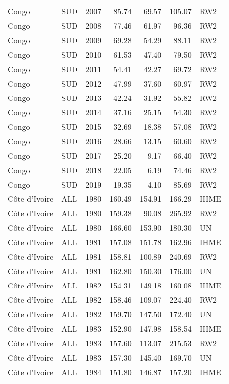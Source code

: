 \begin{longtable}{lllrrrl}
  Congo & SUD & 2007 & 85.74 & 69.57 & 105.07 & RW2 \\ 
  Congo & SUD & 2008 & 77.46 & 61.97 & 96.36 & RW2 \\ 
  Congo & SUD & 2009 & 69.28 & 54.29 & 88.11 & RW2 \\ 
  Congo & SUD & 2010 & 61.53 & 47.40 & 79.50 & RW2 \\ 
  Congo & SUD & 2011 & 54.41 & 42.27 & 69.72 & RW2 \\ 
  Congo & SUD & 2012 & 47.99 & 37.60 & 60.97 & RW2 \\ 
  Congo & SUD & 2013 & 42.24 & 31.92 & 55.82 & RW2 \\ 
  Congo & SUD & 2014 & 37.16 & 25.15 & 54.30 & RW2 \\ 
  Congo & SUD & 2015 & 32.69 & 18.38 & 57.08 & RW2 \\ 
  Congo & SUD & 2016 & 28.66 & 13.15 & 60.60 & RW2 \\ 
  Congo & SUD & 2017 & 25.20 & 9.17 & 66.40 & RW2 \\ 
  Congo & SUD & 2018 & 22.05 & 6.19 & 74.46 & RW2 \\ 
  Congo & SUD & 2019 & 19.35 & 4.10 & 85.69 & RW2 \\ 
  C\^{o}te d'Ivoire & ALL & 1980 & 160.49 & 154.91 & 166.29 & IHME \\ 
  C\^{o}te d'Ivoire & ALL & 1980 & 159.38 & 90.08 & 265.92 & RW2 \\ 
  C\^{o}te d'Ivoire & ALL & 1980 & 166.60 & 153.90 & 180.30 & UN \\ 
  C\^{o}te d'Ivoire & ALL & 1981 & 157.08 & 151.78 & 162.96 & IHME \\ 
  C\^{o}te d'Ivoire & ALL & 1981 & 158.81 & 100.89 & 240.69 & RW2 \\ 
  C\^{o}te d'Ivoire & ALL & 1981 & 162.80 & 150.30 & 176.00 & UN \\ 
  C\^{o}te d'Ivoire & ALL & 1982 & 154.31 & 149.18 & 160.08 & IHME \\ 
  C\^{o}te d'Ivoire & ALL & 1982 & 158.46 & 109.07 & 224.40 & RW2 \\ 
  C\^{o}te d'Ivoire & ALL & 1982 & 159.70 & 147.50 & 172.40 & UN \\ 
  C\^{o}te d'Ivoire & ALL & 1983 & 152.90 & 147.98 & 158.54 & IHME \\ 
  C\^{o}te d'Ivoire & ALL & 1983 & 157.60 & 113.07 & 215.53 & RW2 \\ 
  C\^{o}te d'Ivoire & ALL & 1983 & 157.30 & 145.40 & 169.70 & UN \\ 
  C\^{o}te d'Ivoire & ALL & 1984 & 151.80 & 146.87 & 157.20 & IHME \\ 

\end{longtable}
